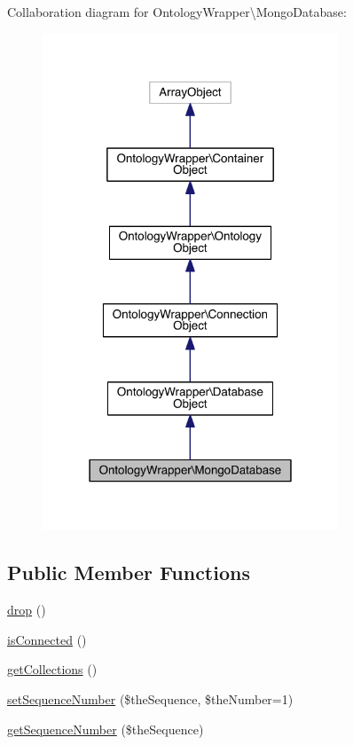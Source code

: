 Collaboration diagram for Ontology\-Wrapper\textbackslash{}Mongo\-Database\-:
\nopagebreak
\begin{figure}[H]
\begin{center}
\leavevmode
\includegraphics[width=250pt]{class_ontology_wrapper_1_1_mongo_database__coll__graph}
\end{center}
\end{figure}
\subsection*{Public Member Functions}
\begin{DoxyCompactItemize}
\item 
\hyperlink{class_ontology_wrapper_1_1_mongo_database_ab3df5cac7ce7f15f3c3a2c0feb9cb0ae}{drop} ()
\item 
\hyperlink{class_ontology_wrapper_1_1_mongo_database_aa0d740a0f02a9093b84367d608e0b781}{is\-Connected} ()
\item 
\hyperlink{class_ontology_wrapper_1_1_mongo_database_aea2876ae9fc23f227d34fadfcd91c52b}{get\-Collections} ()
\item 
\hyperlink{class_ontology_wrapper_1_1_mongo_database_abb8850dbf55ad8684ec5244f60d220ba}{set\-Sequence\-Number} (\$the\-Sequence, \$the\-Number=1)
\item 
\hyperlink{class_ontology_wrapper_1_1_mongo_database_a86848d0cc3c72a0a40938338483799a7}{get\-Sequence\-Number} (\$the\-Sequence)
\end{DoxyCompactItemize}
